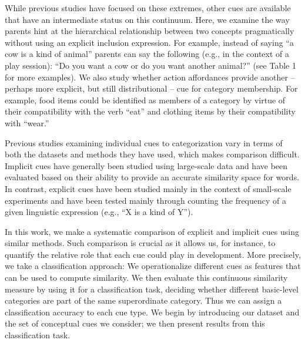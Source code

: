 \documentclass[10pt, letterpaper]{article}
\begin{document}
While previous studies have focused on these extremes, other cues are
available that have an intermediate status on this continuum. Here, we
examine the way parents hint at the hierarchical relationship between
two concepts pragmatically without using an explicit inclusion
expression. For example, instead of saying ``a cow is a kind of animal''
parents can say the following (e.g., in the context of a play session):
``Do you want a cow or do you want another animal?'' (see Table 1 for
more examples). We also study whether action affordances provide another -- perhaps more explicit, but still distributional -- cue for category membership.
For example, food items could be identified as members of a category by virtue of their compatibility with the verb ``eat'' and clothing items by their compatibility with ``wear.''

Previous studies examining individual cues to categorization vary in terms of both the datasets and methods
they have used, which makes comparison difficult. Implicit cues have
generally been studied using large-scale data and have been evaluated
based on their ability to provide an accurate similarity space for
words. In contrast, explicit cues have been studied mainly in the
context of small-scale experiments and have been tested mainly through
counting the frequency of a given linguistic expression (e.g., ``X is a
kind of Y'').

In this work, we make a systematic comparison of explicit and implicit
cues using similar methods. Such comparison is crucial as it allows us,
for instance, to quantify the relative role that each cue could play in
development. More precisely, we take a classification approach: We
operationalize different cues as features that can be used to compute
similarity. We then evaluate this continuous similarity measure by using
it for a classification task, deciding whether different basic-level
categories are part of the same superordinate category. Thus we can
assign a classification accuracy to each cue type. We begin by introducing our dataset and the set of conceptual cues we consider; we then present results from this classification task.
\end{document}
